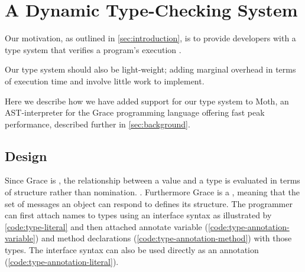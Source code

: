 
\section{A Dynamic Type-Checking System}
\label{sec:method}


Our motivation, as outlined in \cref{sec:introduction}, is to provide developers with
a type system that verifies a program's execution .

Our type system should also be light-weight; 
adding marginal overhead in terms of execution time and
involve little work to implement.

Here we describe how we have added support for our type system to Moth,
an AST-interpreter for the Grace programming language offering fast peak performance,
described further in \cref{sec:background}. 






\subsection{Design}



Since Grace is , 
the relationship between a value and a type is evaluated in terms of structure rather than nomination.
.
Furthermore Grace is a ,
meaning that the set of messages an object can respond to defines its structure.
The programmer can first attach names to types using an interface syntax as illustrated by \cref{code:type-literal}
and then attached annotate variable (\cref{code:type-annotation-variable})
and method declarations (\cref{code:type-annotation-method})
with those types. 
The interface syntax can also be used directly as an annotation (\ref{code:type-annotation-literal}).

